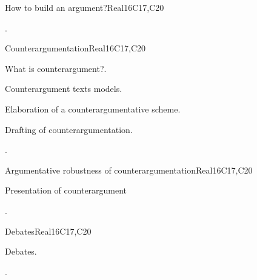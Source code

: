 \begin{syllabus}
\begin{unit}{How to build an argument?}{}{Real}{16}{C17,C20}
  \begin{learningoutcomes}
   \item .%
  \end{learningoutcomes}
\end{unit}

\begin{unit}{Counterargumentation}{}{Real}{16}{C17,C20}
  \begin{topics}
      \item What is counterargument?.
      \item Counterargument texts models.
      \item Elaboration of a counterargumentative scheme.
      \item Drafting of counterargumentation.
  \end{topics}

  \begin{learningoutcomes}
   \item .%
  \end{learningoutcomes}
\end{unit}

\begin{unit}{Argumentative robustness of counterargumentation}{}{Real}{16}{C17,C20}
  \begin{topics}
      \item Presentation of counterargument
  \end{topics}

  \begin{learningoutcomes}
   \item .%
  \end{learningoutcomes}
\end{unit}


\begin{unit}{Debates}{}{Real}{16}{C17,C20}
  \begin{topics}
      \item Debates.
  \end{topics}

  \begin{learningoutcomes}
   \item .%
  \end{learningoutcomes}
\end{unit}




\begin{coursebibliography}
\end{coursebibliography}

\end{syllabus}
